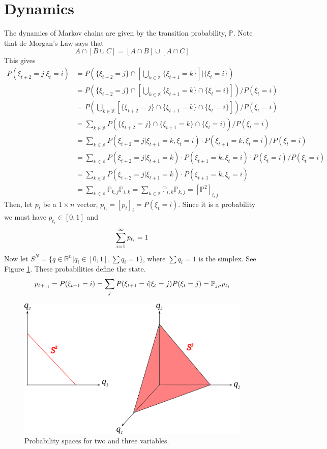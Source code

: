 \documentclass[lecture,12pt,]{pcms-l}
\begin{document}
\section{Dynamics}
The dynamics of Markov chains are given by the transition probability, $\mathbb{P}$. Note that de Morgan's Law says that
$$A\cap[B\cup C] = [A\cap B] \cup [A\cap C]$$
This gives
\begin{align*}
P\left(\xi_{t+2}=j | \xi_t=i\right) &= P\left(\{\xi_{t+2}=j\} \cap \left[\bigcup_{k\in\mathbb{X}}\{\xi_{t+1}=k\}\right] | \{\xi_t=i\}\right) \\
&= P\left(\{\xi_{t+2}=j\} \cap \left[\bigcup_{k\in\mathbb{X}}\{\xi_{t+1}=k\} \cap \{\xi_t=i\}\right]\right) / P(\xi_t=i) \\
&= P\left(\bigcup_{k\in\mathbb{X}}[\{\xi_{t+2}=j\} \cap \{\xi_{t+1}=k\} \cap \{\xi_t=i\}]\right) / P(\xi_t=i) \\
&= \sum_{k\in\mathbb{X}} P(\{\xi_{t+2}=j\} \cap \{\xi_{t+1}=k\} \cap \{\xi_t=i\}) / P(\xi_t=i) \\
&= \sum_{k\in\mathbb{X}} P(\xi_{t+2}=j | \xi_{t+1}=k,\xi_t=i) \cdot P(\xi_{t+1}=k,\xi_t=i) / P(\xi_t=i) \\
&= \sum_{k\in\mathbb{X}} P(\xi_{t+2}=j | \xi_{t+1}=k) \cdot P(\xi_{t+1}=k,\xi_t=i) \cdot P(\xi_t=i) / P(\xi_t=i) \\
&= \sum_{k\in\mathbb{X}} P(\xi_{t+2}=j | \xi_{t+1}=k) \cdot P(\xi_{t+1}=k,\xi_t=i) \\
&= \sum_{k\in\mathbb{X}} \mathbb{P}_{k,j}\mathbb{P}_{i,k} = \sum_{k\in\mathbb{X}} \mathbb{P}_{i,k}\mathbb{P}_{k,j} = \left[\mathbb{P}^2\right]_{i,j}
\end{align*}
Then, let $p_t$ be a $1\times n$ vector, $p_{t_i}=[p_t]_i=P(\xi_t=i)$. Since it is a probability we must have $p_{t_i}\in[0,1]$ and
$$\sum_{i=1}^\infty p_{t_i}=1$$
Now let $S^N=\{q\in\mathbb{R}^n|q_i\in[0,1],\sum q_i=1\}$, where $\sum q_i=1$ is the simplex. See Figure \ref{fig:09s2s3}. These probabilities define the state.
$$p_{{t+1}_i} = P(\xi_{t+1}=i) = \sum_jP(\xi_{t+1}=i|\xi_t=j)P(\xi_t=j) = \mathbb{P}_{j,i} p_{t_i}$$

\begin{figure}[ht!]
	\centering
	\includegraphics[width=.4\textwidth]{images/09s2s3}
	\caption{Probability spaces for two and three variables.}
	\label{fig:09s2s3}
\end{figure}
\end{document}
